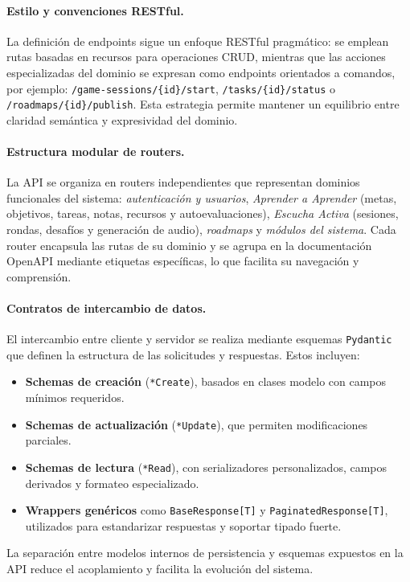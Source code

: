 \paragraph{Estilo y convenciones RESTful.}
La definición de endpoints sigue un enfoque RESTful pragmático: se emplean rutas basadas en
recursos para operaciones CRUD, mientras que las acciones especializadas del dominio se expresan como endpoints orientados a comandos, por ejemplo: \texttt{/game-sessions/\{id\}/start}, \texttt{/tasks/\{id\}/status} o \texttt{/roadmaps/\{id\}/publish}. Esta estrategia permite mantener un equilibrio entre claridad semántica y expresividad del dominio.

\paragraph{Estructura modular de routers.}
La API se organiza en routers independientes que representan dominios funcionales del sistema: \textit{autenticación y usuarios}, \textit{Aprender a Aprender} (metas, objetivos, tareas, notas, recursos y autoevaluaciones), \textit{Escucha Activa} (sesiones, rondas, desafíos y generación de audio), \textit{roadmaps} y \textit{módulos del sistema}. Cada router encapsula las rutas de su dominio y se agrupa en la documentación OpenAPI mediante etiquetas específicas, lo que facilita su navegación y comprensión.

\paragraph{Contratos de intercambio de datos.}
El intercambio entre cliente y servidor se realiza mediante esquemas \texttt{Pydantic} que definen la estructura de las solicitudes y respuestas. Estos incluyen:
\begin{itemize}
    \item \textbf{Schemas de creación} (\texttt{*Create}), basados en clases modelo con campos mínimos requeridos.
    \item \textbf{Schemas de actualización} (\texttt{*Update}), que permiten modificaciones parciales.
    \item \textbf{Schemas de lectura} (\texttt{*Read}), con serializadores personalizados, campos derivados y formateo especializado.
    \item \textbf{Wrappers genéricos} como \texttt{BaseResponse[T]} y \texttt{PaginatedResponse[T]}, utilizados para estandarizar respuestas y soportar tipado fuerte.
\end{itemize}
La separación entre modelos internos de persistencia y esquemas expuestos en la API reduce el
acoplamiento y facilita la evolución del sistema.

